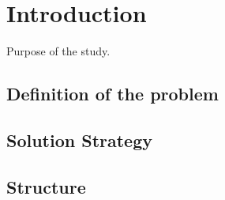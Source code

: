 


\chapter{Introduction} \label{chap1:introduction}
Purpose of the study.
\section{Definition of the problem} \label{sec1:problem}
\section{Solution Strategy} \label{sec1:solution_strategy}
\section{Structure} \label{sec1:structure}
